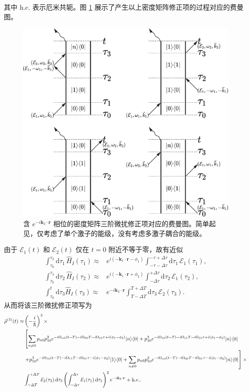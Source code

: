 \documentclass{thesis}
\begin{document}
其中 h.c. 表示厄米共轭。图 \ref{Feynman Diagram} 展示了产生以上密度矩阵修正项的过程对应的费曼图。
\begin{figure}[h]
    \centering
    \includegraphics[width=.5\columnwidth]{Img/Feynman Diagram.pdf}
    \caption{含 $e^{-i\bm{k}_2\cdot\bm{r}}$ 相位的密度矩阵三阶微扰修正项对应的费曼图。简单起见，仅考虑了单个激子的能级，没有考虑多激子耦合的能级。}
    \label{Feynman Diagram}
\end{figure}
由于 $\mathcal{E}_1(t)$ 和 $\mathcal{E}_2(t)$ 仅在 $t=0$ 附近不等于零，故有近似
\begin{align}
    \int_{\tau_0}^{\tau_2}\mathrm{d}\tau_1\,\hat{H}_I(\tau_1)\approx&e^{i(-\bm{k}_1\cdot\bm{r}-\phi_1)}\int_{-\tau-\Delta\tau}^{-\tau+\Delta\tau}\mathrm{d}\tau_1\,\mathcal{E}_1(\tau_1),\\
    \int_{\tau_0}^{\tau_3}\mathrm{d}\tau_2\,\hat{H}_I(\tau_2)\approx&e^{i(-\bm{k}_1\cdot\bm{r}+\phi_2)}\int_{-\Delta\tau}^{+\Delta\tau}\mathrm{d}\tau_2\,\mathcal{E}_1(\tau_2),\\
    \int_{\tau_0}^t\mathrm{d}\tau_3\hat{H}_I(\tau_3)\approx&e^{-i\bm{k}_3\cdot\bm{r}}\int_{T-\Delta T}^{T+\Delta T}\mathrm{d}\tau_3\,\mathcal{E}_2(\tau_3).
\end{align}
从而将该三阶微扰修正项写为
{\small
\begin{align}
    \label{Density matrix-Time domain-3rd order corrrection}
    \notag\hat{\rho}^{(3)}(t)\approx&\left(-\frac{i}{\hbar}\right)^3\times\\
    \notag&\left[\sum_{n\neq 0}p_{n0}p_{10}^2e^{-i\Omega_{n0}(t-T)-i\Omega_{00}T-i\Omega_{10}\tau+i(\phi_1-\phi_2)}\lvert n\rangle\langle 0\rvert+p_{10}^3e^{-i\Omega_{10}(t-T)-i\Omega_{11}T-i\Omega_{10}\tau+i(\phi_1-\phi_2)}\lvert n\rangle\langle 0\rvert\right.\\
    \notag&\left.+p_{10}^3e^{-i\Omega_{10}(t-T)-i\Omega_{11}T-i\Omega_{01}\tau-i(\phi_1-\phi_2)}\lvert 1\rangle\langle 0\rvert+\sum_{n\neq 0}p_{n0}p_{10}^2e^{-i\Omega_{n0}(t-T)-i\Omega_{00}T-i\Omega_{01}\tau-i(\phi_1-\phi_2)}\lvert n\rangle\langle 0\rvert\right]\times\\
    &\int_{-\Delta T}^{+\Delta T}\mathcal{E}_2(\tau_3)\,\mathrm{d}\tau_3\left(\int_{-\Delta\tau}^{\Delta\tau}\mathcal{E}_1(\tau_1)\,\mathrm{d}\tau_1\right)^2e^{-i\bm{k}_2\cdot\bm{r}}+\text{h.c.}.
\end{align}
}%
\end{document}
